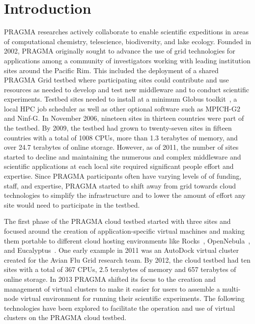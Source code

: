 \documentclass{acm_proc_article-sp}
\begin{document}



\section{Introduction}
\label{Sec:intro}

 PRAGMA researches actively collaborate to enable scientific expeditions in areas of computational chemistry, telescience, biodiversity, and lake ecology.  Founded in 2002, PRAGMA originally sought to advance the use of grid technologies for applications among a community of investigators working with leading institution sites around the Pacific Rim.  This included the deployment of a shared PRAGMA Grid testbed where participating sites could contribute and use resources as needed to develop and test new middleware and to conduct scientific experiments.  Testbed sites needed to install at a minimum Globus toolkit~\cite{globus}, a local HPC job scheduler as well as other optional software such as MPICH-G2 and Ninf-G.  In November 2006, nineteen sites in thirteen countries were part of the testbed.  By 2009, the testbed had grown to twenty-seven sites in fifteen countries with a total of 1008 CPUs, more than 1.3 terabytes of memory, and over 24.7 terabytes of online storage.  However, as of 2011, the number of sites started to decline and maintaining the numerous and complex middleware and scientific applications at each local site required significant people effort and expertise.  Since PRAGMA participants often have varying levels of of funding, staff, and expertise, PRAGMA started to shift away from grid towards cloud technologies to simplify the infrastructure and to lower the amount of effort any site would need to participate in the testbed.  

The first phase of the PRAGMA cloud testbed started with three sites and focused around the creation of application-specific virtual machines and making them portable to  different cloud hosting environments like Rocks~\cite{rocks}, OpenNebula~\cite{opennebula}, and Eucalyptus~\cite{eucalyptus}.
One early example in 2011 was an AutoDock virtual cluster created for the Avian Flu Grid research team.   By 2012, the cloud testbed had ten sites with a total of 367 CPUs, 2.5 terabytes of memory and 657 terabytes of online storage.  In 2013 PRAGMA shifted its  focus to the creation and management of virtual clusters to make it easier for users to assemble a multi-node virtual environment for running their scientific experiments.  The following technologies have been explored to facilitate the operation and use of virtual clusters on the PRAGMA cloud testbed.
\end{document}
